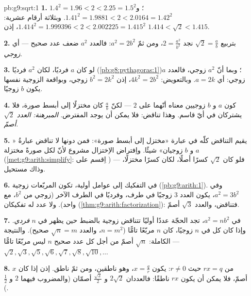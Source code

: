 \begin{solution}{pb:g9:sqrt:1}
\textbf{1.} $1.4^2 = 1.96 < 2 < 2.25 = 1.5^2$؛
و $1.41^2 = 1.9881 < 2 < 2.0164 = 1.42^2$. وبثلاثة أرقام عشرية:
$1.414^2 = 1.999396 < 2 < 2.002225 = 1.415^2$، إذن
$1.414 < \sqrt2 < 1.415$.

\textbf{2.} بتربيع $\sqrt2 = \frac ab$ نجد
$2 = \frac{a^2}{b^2}$، ومن ثمّ $a^2 = 2b^2$: فالعدد $a^2$ ضعف عدد
صحيح --- أي \emph{زوجي}.

\textbf{3.} لو كان $a$ فرديًا، لكان $a^2$ فرديًا
(\cref{pb:g8:pythagoras:1})؛ وبما أنّ $a^2$ زوجي، فالعدد $a$
زوجي: أي $a = 2k$. وبالتعويض: $4k^2 = 2b^2$، إذن $b^2 = 2k^2$
زوجي، وبواقعة الزوجية نفسها يكون $b$ زوجيًا.

\textbf{4.} كون $a$ و $b$ زوجيين معناه أنّهما 
على $2$ --- لكنّ $\frac ab$ كان مختزلًا إلى أبسط صورة، فلا يشتركان
في أيّ قاسم. وهذا تناقض: فلا يمكن أن يوجد  المفترض.
\emph{المبرهنة: العدد $\sqrt2$ أصمّ.}

\textbf{5.} يقيم التناقض كلّه في عبارة «مختزل إلى أبسط صورة»:
فمن دونها لا تناقض عبارةُ «$a$ و $b$ زوجيان» شيئًا.
واِفتراض الاِختزال مشروع لأنّ لكل  صورةً مختزلة
(\cref{met:g9:arith:simplify}: اِقسم على )
--- فلو كان $\sqrt2$ كسرًا أصلًا، لكان كسرًا مختزلًا، وذاك
مستحيل.

\textbf{6.} في التفكيك إلى عوامل أولية، تكون المربّعات
زوجية  (\cref{pb:g9:arith:1}). وفي $a^2 = 3b^2$، يكون
 العدد $3$ زوجيًا في طرف، وفرديًا في الطرف الآخر
(زوجي من $b^2$، مع واحد). ولا عدد له تفكيكان
(\cref{thm:g9:arith:factorization}): فتناقض، والعدد $\sqrt3$ أصمّ.

\textbf{7.} في $a^2 = n b^2$، تجد الحجّة عددًا أوليًا تتناقض
زوجية  بالضبط حين يظهر  في $n$
 \emph{فردي}. وإذا كان كل  في $n$
زوجيًا، كان $n$ مربّعًا تامًّا ($n = m^2$، والعدد
$\sqrt n = m$ صحيح). والنتيجة الكاملة: $\sqrt n$ أصمّ من أجل كل
عدد صحيح $n$ ليس مربّعًا تامًّا ---
$\sqrt2, \sqrt3, \sqrt5, \sqrt6, \sqrt7, \sqrt8, \sqrt{10},
\dots$

\textbf{8.} من $r x = q$ حيث $r \neq 0$: يكون
$x = \frac qr$، وهو  ناطقين، ومن ثمّ ناطق. إذن إذا
كان $x$ أصمّ، فلا يمكن أن يكون $r x$ ناطقًا: فالعددان $2\sqrt2$
و $\frac{\sqrt2}{2}$ أصمّان (والمضروب فيهما $2$
و $\frac12$).


\end{solution}
